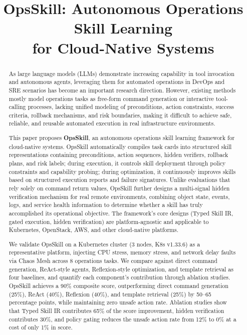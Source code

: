 \documentclass[conference,10pt]{IEEEtran}
\title{OpsSkill: Autonomous Operations Skill Learning\\for Cloud-Native Systems}
\author{
\IEEEauthorblockN{Anonymous}
\IEEEauthorblockA{\textit{Under Review}}
}
\begin{document}
\maketitle

\begin{abstract}
As large language models (LLMs) demonstrate increasing capability in tool invocation and autonomous agents, leveraging them for automated operations in DevOps and SRE scenarios has become an important research direction.
However, existing methods mostly model operations tasks as free-form command generation or interactive tool-calling processes, lacking unified modeling of preconditions, action constraints, success criteria, rollback mechanisms, and risk boundaries, making it difficult to achieve safe, reliable, and reusable automated execution in real infrastructure environments.

This paper proposes \textbf{OpsSkill}, an autonomous operations skill learning framework for cloud-native systems.
OpsSkill automatically compiles task cards into structured skill representations containing preconditions, action sequences, hidden verifiers, rollback plans, and risk labels; during execution, it controls skill deployment through policy constraints and capability probing; during optimization, it continuously improves skills based on structured execution reports and failure signatures.
Unlike evaluations that rely solely on command return values, OpsSkill further designs a multi-signal hidden verification mechanism for real remote environments, combining object state, events, logs, and service health information to determine whether a skill has truly accomplished its operational objective.
The framework's core designs (Typed Skill IR, gated execution, hidden verification) are platform-agnostic and applicable to Kubernetes, OpenStack, AWS, and other cloud-native platforms.

We validate OpsSkill on a Kubernetes cluster (3 nodes, K8s v1.33.6) as a representative platform, injecting CPU stress, memory stress, and network delay faults via Chaos Mesh across 8 operations tasks.
We compare against direct command generation, ReAct-style agents, Reflexion-style optimization, and template retrieval as four baselines, and quantify each component's contribution through ablation studies.
OpsSkill achieves a 90\% composite score, outperforming direct command generation (25\%), ReAct (40\%), Reflexion (40\%), and template retrieval (25\%) by 50--65 percentage points, while maintaining zero unsafe action rate.
Ablation studies show that Typed Skill IR contributes 65\% of the score improvement, hidden verification contributes 30\%, and policy gating reduces the unsafe action rate from 12\% to 0\% at a cost of only 1\% in score.
\end{abstract}
\end{document}
